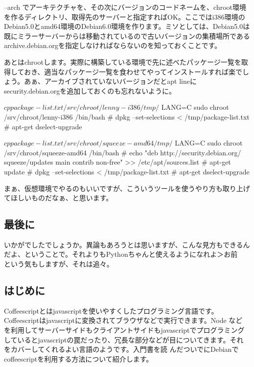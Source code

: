 \documentclass[mingoth,a4paper]{jsarticle}
\begin{document}
--arch でアーキテクチャを、その次にバージョンのコードネームを、chroot環境を作るディレクトリ、取得先のサーバーと指定すればOK。ここではi386環境のDebian5.0とamd64環境のDebian6.0環境を作ります。ミソとしては、Debian5.0は既にミラーサーバーからは移動されているので古いバージョンの集積場所であるarchive.debian.orgを指定しなければならないのを知っておくことです。

あとはchrootします。実際に構築している環境で先に述べたパッケージ一覧を取得しておき、適当なパッケージ一覧を食わせてやってインストールすれば楽でしょう。あぁ、アーカイブされていないバージョンだとapt lineにsecurity.debian.orgを追加しておくのも忘れないように。

\begin{commandline}
$ cp package-list.txt /srv/chroot/lenny-i386/tmp/
$ LANG=C sudo chroot /srv/chroot/lenny-i386 /bin/bash
# dpkg --set-selections < /tmp/package-list.txt
# apt-get dselect-upgrade
\end{commandline}

\begin{commandline}
$ cp package-list.txt /srv/chroot/squeeze-amd64/tmp/
$ LANG=C sudo chroot /srv/chroot/squeeze-amd64 /bin/bash
# echo "deb http://security.debian.org/ squeeze/updates main contrib non-free" >> /etc/apt/sources.list
# apt-get update
# dpkg --set-selections < /tmp/package-list.txt
# apt-get dselect-upgrade
\end{commandline}

まぁ、仮想環境でやるのもいいですが、こういうツールを使うやり方も取り上げてほしいものだなぁ、と思います。

\subsection{最後に}

いかがでしたでしょうか。異論もあろうとは思いますが、こんな見方もできるんだよ、ということで。それよりもPythonちゃんと使えるようになれよ＞お前　という気もしますが、それは追々。



\subsection{はじめに}

Coffeescriptとはjavascriptを使いやすくしたプログラミング言語です。
Coffeescriptはjavascriptに変換されてブラウザなどで実行できます。Node など
を利用してサーバーサイドもクライアントサイドもjavascriptでプログラミング
しているとjavascriptの罠だったり、冗長な部分などが目についてきます。それ
をカバーしてくれるよい言語のようです。入門書\cite{smoothcoffeescript}を読
んだついでにDebianでcoffeescriptを利用する方法について紹介します。
\end{document}
